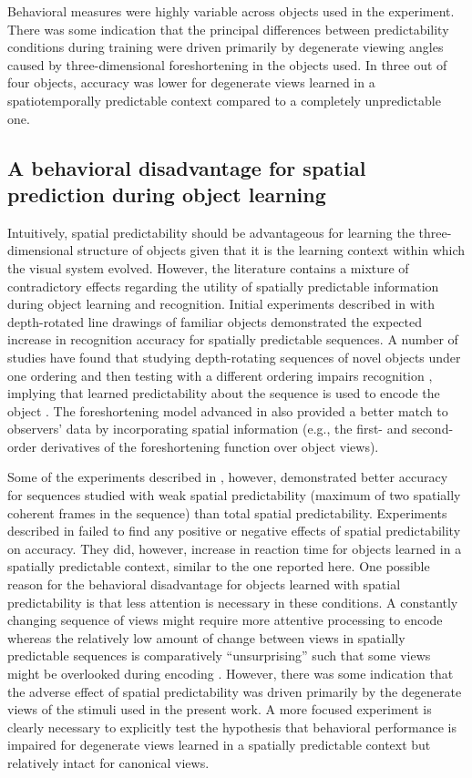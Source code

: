\documentclass[dwyatte_dissertation.tex]{subfiles}
\begin{document}
Behavioral measures were highly variable across objects used in the experiment. There was some indication that the principal differences between predictability conditions during training were driven primarily by degenerate viewing angles caused by three-dimensional foreshortening in the objects used. In three out of four objects, accuracy was lower for degenerate views learned in a spatiotemporally predictable context compared to a completely unpredictable one.

\subsection{A behavioral disadvantage for spatial prediction during object learning}
Intuitively, spatial predictability should be advantageous for learning the three-dimensional structure of objects given that it is the learning context within which the visual system evolved. However, the literature contains a mixture of contradictory effects regarding the utility of spatially predictable information during object learning and recognition. Initial experiments described in  with depth-rotated line drawings of familiar objects demonstrated the expected increase in recognition accuracy for spatially predictable sequences. A number of studies have found that studying depth-rotating sequences of novel objects under one ordering and then testing with a different ordering impairs recognition \cite{Stone98,VuongTarr04,ChuangVuongBulthoff12}, implying that learned predictability about the sequence is used to encode the object \cite{BalasSinha09c}. The foreshortening model advanced in \cite{BalasSinha09b} also provided a better match to observers' data by incorporating spatial information (e.g., the first- and second-order derivatives of the foreshortening function over object views).

Some of the experiments described in , however, demonstrated better accuracy for sequences studied with weak spatial predictability (maximum of two spatially coherent frames in the sequence) than total spatial predictability. Experiments described in  failed to find any positive or negative effects of spatial predictability on accuracy. They did, however, increase in reaction time for objects learned in a spatially predictable context, similar to the one reported here. One possible reason for the behavioral disadvantage for objects learned with spatial predictability is that less attention is necessary in these conditions. A constantly changing sequence of views might require more attentive processing to encode whereas the relatively low amount of change between views in spatially predictable sequences is comparatively ``unsurprising'' such that some views might be overlooked during encoding \cite{TarrGauthier98}. However, there was some indication that the adverse effect of spatial predictability was driven primarily by the degenerate views of the stimuli used in the present work. A more focused experiment is clearly necessary to explicitly test the hypothesis that behavioral performance is impaired for degenerate views learned in a spatially predictable context but relatively intact for canonical views. 
\end{document}
